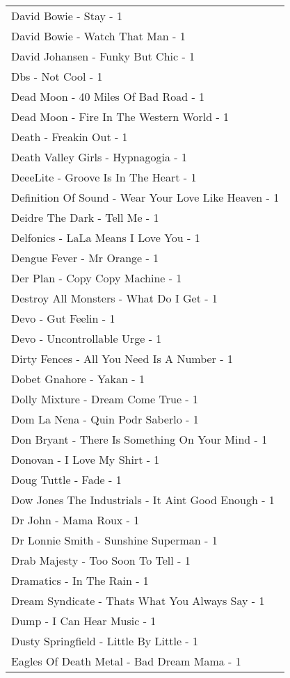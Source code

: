 \documentclass[
]{article}
\begin{document}
\begin{longtable}{l}
David Bowie - Stay - 1 \\ 
David Bowie - Watch That Man - 1 \\ 
David Johansen - Funky But Chic - 1 \\ 
Dbs - Not Cool - 1 \\ 
Dead Moon - 40 Miles Of Bad Road - 1 \\ 
Dead Moon - Fire In The Western World - 1 \\ 
Death - Freakin Out - 1 \\ 
Death Valley Girls - Hypnagogia - 1 \\ 
DeeeLite - Groove Is In The Heart - 1 \\ 
Definition Of Sound - Wear Your Love Like Heaven - 1 \\ 
Deidre The Dark - Tell Me - 1 \\ 
Delfonics - LaLa Means I Love You - 1 \\ 
Dengue Fever - Mr Orange - 1 \\ 
Der Plan - Copy Copy Machine - 1 \\ 
Destroy All Monsters - What Do I Get - 1 \\ 
Devo - Gut Feelin - 1 \\ 
Devo - Uncontrollable Urge - 1 \\ 
Dirty Fences - All You Need Is A Number - 1 \\ 
Dobet Gnahore - Yakan - 1 \\ 
Dolly Mixture - Dream Come True - 1 \\ 
Dom La Nena - Quin Podr Saberlo - 1 \\ 
Don Bryant - There Is Something On Your Mind - 1 \\ 
Donovan - I Love My Shirt - 1 \\ 
Doug Tuttle - Fade - 1 \\ 
Dow Jones The Industrials - It Aint Good Enough - 1 \\ 
Dr John - Mama Roux - 1 \\ 
Dr Lonnie Smith - Sunshine Superman - 1 \\ 
Drab Majesty - Too Soon To Tell - 1 \\ 
Dramatics - In The Rain - 1 \\ 
Dream Syndicate - Thats What You Always Say - 1 \\ 
Dump - I Can Hear Music - 1 \\ 
Dusty Springfield - Little By Little - 1 \\ 
Eagles Of Death Metal - Bad Dream Mama - 1 \\ 

\end{longtable}
\end{document}
